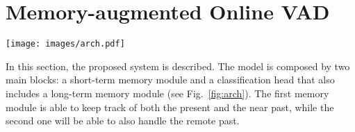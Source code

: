 \section{Memory-augmented Online VAD}
\label{sec:theory}

\fboxsep=1mm%
\fboxrule=1pt%

\begin{figure*}[!ht]
            \centerline{\texttt{[image: images/arch.pdf]}}
        \caption{The online video frame anomaly detection architecture. $f[t]$ is the frame at time $t$, $x$ the output of the Reducer.}
		\label{fig:arch}
\end{figure*}

In this section, the proposed system is described.  
The model is composed by two main blocks: a short-term memory module and a classification head that also includes a long-term  memory module (see Fig.~\ref{fig:arch}). 
The first memory module is able to keep track of both the present and the near past, while the second one will be able to also handle the remote past.

